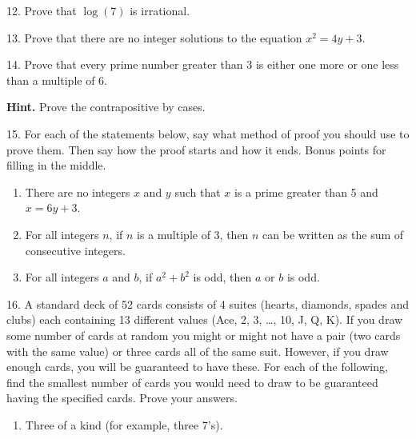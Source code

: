 \documentclass[10pt,]{book}
\theoremstyle{plain}
\theoremstyle{definition}
\numberwithin{equation}{chapter}
\begin{document}
\begin{exerciselist}
\par\smallskip
\item[12.]\hypertarget{exercise-253}{}
          Prove that \(\log(7)\) is irrational.
\par\smallskip
\item[13.]\hypertarget{exercise-254}{}
          Prove that there are no integer solutions to the equation \(x^2 = 4y + 3\).
\par\smallskip
\item[14.]\hypertarget{exercise-255}{}
          Prove that every prime number greater than 3 is either one more or one less than a multiple of 6.
\par\smallskip
\par\smallskip
\noindent\textbf{Hint.}\hypertarget{hint-14}{}\quad
Prove the contrapositive by cases.%
\item[15.]\hypertarget{exercise-256}{}
          For each of the statements below, say what method of proof you should use to prove them. Then say how the proof starts and how it ends. Bonus points for filling in the middle.
\leavevmode%
\begin{enumerate}[label=(\alph*)]
\item\hypertarget{li-694}{}
              There are no integers \(x\) and \(y\) such that \(x\) is a prime greater than 5 and \(x = 6y + 3\).
\item\hypertarget{li-695}{}
              For all integers \(n\), if \(n\) is a multiple of 3, then \(n\) can be written as the sum of consecutive integers.
\item\hypertarget{li-696}{}
              For all integers \(a\) and \(b\), if \(a^2 + b^2\) is odd, then \(a\) or \(b\) is odd.
\end{enumerate}
\par\smallskip
\item[16.]\hypertarget{exercise-257}{}
          A standard deck of 52 cards consists of 4 suites (hearts, diamonds, spades and clubs) each containing 13 different values (Ace, 2, 3, \dots{}, 10, J, Q, K). If you draw some number of cards at random you might or might not have a pair (two cards with the same value) or three cards all of the same suit. However, if you draw enough cards, you will be guaranteed to have these. For each of the following, find the smallest number of cards you would need to draw to be guaranteed having the specified cards. Prove your answers.
\leavevmode%
\begin{enumerate}[label=(\alph*)]
\item\hypertarget{li-700}{}
              Three of a kind (for example, three 7's).



\end{enumerate}
\end{exerciselist}
\end{document}
